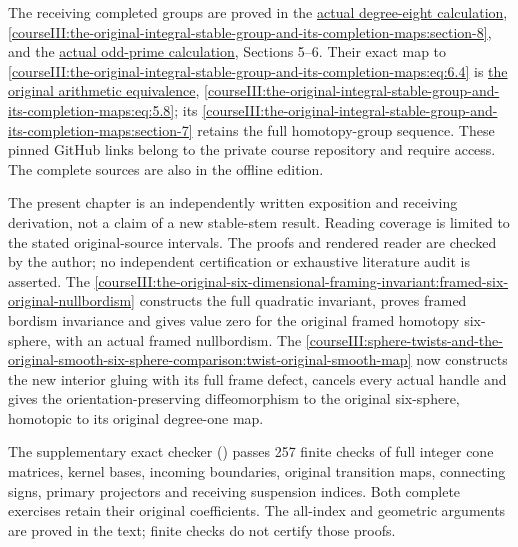 The receiving completed groups are proved in the \href{https://github.com/KokunoYumeto/open-math-courses/blob/72ad56efaa6388f333c9b477ff86a2b5c5b2e326/docs/courses/CG-S6/src/the-actual-mod-two-cooperation-comparison-through-degree-eight.md\#actual-eight-receiving-cobar}{actual degree-eight calculation}, \cref{courseIII:the-original-integral-stable-group-and-its-completion-maps:section-8}, and the \href{https://github.com/KokunoYumeto/open-math-courses/blob/72ad56efaa6388f333c9b477ff86a2b5c5b2e326/docs/courses/CG-S6/src/the-original-odd-prime-cooperations-and-degree-six-adams-calculation.md\#odd-actual-adams}{actual odd-prime calculation}, Sections 5--6. Their exact map to \eqref{courseIII:the-original-integral-stable-group-and-its-completion-maps:eq:6.4} is \href{https://github.com/KokunoYumeto/open-math-courses/blob/72ad56efaa6388f333c9b477ff86a2b5c5b2e326/docs/courses/CG-S6/src/the-original-adams-tower-and-arithmetic-completion.md\#arithmetic-adams-equivalence}{the original arithmetic equivalence}, \eqref{courseIII:the-original-integral-stable-group-and-its-completion-maps:eq:5.8}; its \cref{courseIII:the-original-integral-stable-group-and-its-completion-maps:section-7} retains the full homotopy-group sequence. These pinned GitHub links belong to the private course repository and require access. The complete sources are also in the offline edition.

The present chapter is an independently written exposition and receiving derivation, not a claim of a new stable-stem result. Reading coverage is limited to the stated original-source intervals. The proofs and rendered reader are checked by the author; no independent certification or exhaustive literature audit is asserted. The \cref{courseIII:the-original-six-dimensional-framing-invariant:framed-six-original-nullbordism} constructs the full quadratic invariant, proves framed bordism invariance and gives value zero for the original framed homotopy six-sphere, with an actual framed nullbordism. The \cref{courseIII:sphere-twists-and-the-original-smooth-six-sphere-comparison:twist-original-smooth-map} now constructs the new interior gluing with its full frame defect, cancels every actual handle and gives the orientation-preserving diffeomorphism to the original six-sphere, homotopic to its original degree-one map.

The supplementary exact checker () passes 257 finite checks of full integer cone matrices, kernel bases, incoming boundaries, original transition maps, connecting signs, primary projectors and receiving suspension indices. Both complete exercises retain their original coefficients. The all-index and geometric arguments are proved in the text; finite checks do not certify those proofs.
